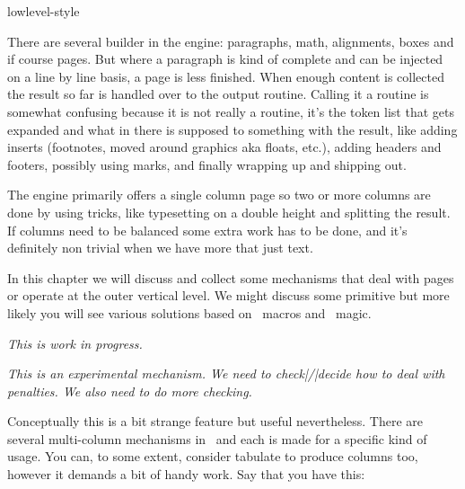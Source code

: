 
\environment lowlevel-style





\setlocalshowmakeup

\startdocument
  [title=pages,
   color=middleyellow]

\startsectionlevel[title=Introduction]

There are several builder in the engine: paragraphs, math, alignments, boxes and
if course pages. But where a paragraph is kind of complete and can be injected on
a line by line basis, a page is less finished. When enough content is collected
the result so far is handled over to the output routine. Calling it a routine is
somewhat confusing because it is not really a routine, it's the token list \type
{\output} that gets expanded and what in there is supposed to something with the
result, like adding inserts (footnotes, moved around graphics aka floats, etc.),
adding headers and footers, possibly using marks, and finally wrapping up and
shipping out.

The engine primarily offers a single column page so two or more columns are done
by using tricks, like typesetting on a double height and splitting the result. If
columns need to be balanced some extra work has to be done, and it's definitely
non trivial when we have more that just text.

In this chapter we will discuss and collect some mechanisms that deal with pages
or operate at the outer vertical level. We might discuss some primitive but more
likely you will see various solutions based on \TEX\ macros and \LUA\ magic.

{\em This is work in progress.}

\stopsectionlevel

\startsectionlevel[title=Rows becoming columns]

{\em This is an experimental mechanism. We need to check|/|decide how to deal
with penalties. We also need to do more checking.}

Conceptually this is a bit strange feature but useful nevertheless. There are
several multi-column mechanisms in \CONTEXT\ and each is made for a specific kind
of usage. You can, to some extent, consider tabulate to produce columns too,
however it demands a bit of handy work. Say that you have this:

